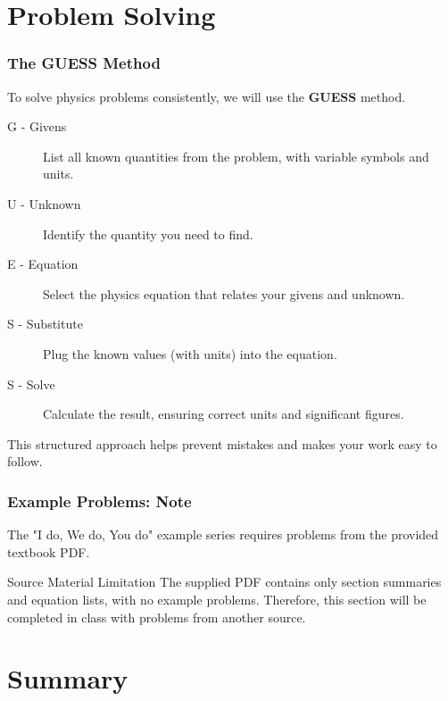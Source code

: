\documentclass{beamer}
\begin{document}
\section{Problem Solving}

\begin{frame}
\frametitle{The GUESS Method}
To solve physics problems consistently, we will use the \textbf{GUESS} method.
\begin{description}
    \item[\alert{G} - Givens] List all known quantities from the problem, with variable symbols and units.
    \item[\alert{U} - Unknown] Identify the quantity you need to find.
    \item[\alert{E} - Equation] Select the physics equation that relates your givens and unknown.
    \item[\alert{S} - Substitute] Plug the known values (with units) into the equation.
    \item[\alert{S} - Solve] Calculate the result, ensuring correct units and significant figures.
\end{description}
This structured approach helps prevent mistakes and makes your work easy to follow.
\end{frame}

\begin{frame}
\frametitle{Example Problems: Note}
The "I do, We do, You do" example series requires problems from the provided textbook PDF.
\vspace{1cm}
\begin{alertblock}{Source Material Limitation}
The supplied PDF contains only section summaries and equation lists, with no example problems.
\vspace{0.5cm}
Therefore, this section will be completed in class with problems from another source.
\end{alertblock}
\end{frame}

\section{Summary}
\end{document}
